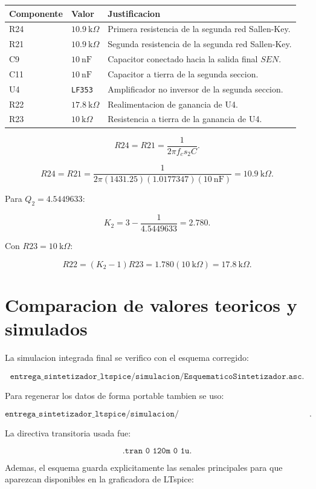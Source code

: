 ﻿\documentclass[11pt,letterpaper]{article}
\newcommand{\kohm}{\text{k}\Omega}
\begin{document}
\begin{longtable}{p{2.0cm}p{4.2cm}p{8.7cm}}
\toprule
Componente & Valor & Justificacion \\
\midrule
\endhead
R24 & \(10.9~\kohm\) & Primera resistencia de la segunda red Sallen-Key. \\
R21 & \(10.9~\kohm\) & Segunda resistencia de la segunda red Sallen-Key. \\
C9 & \(10~\text{nF}\) & Capacitor conectado hacia la salida final \(SEN\). \\
C11 & \(10~\text{nF}\) & Capacitor a tierra de la segunda seccion. \\
U4 & \texttt{LF353} & Amplificador no inversor de la segunda seccion. \\
R22 & \(17.8~\kohm\) & Realimentacion de ganancia de U4. \\
R23 & \(10~\kohm\) & Resistencia a tierra de la ganancia de U4. \\
\bottomrule
\end{longtable}

\[
R24=R21=\frac{1}{2\pi f_cs_2C}.
\]

\[
R24=R21=
\frac{1}{2\pi(1431.25)(1.0177347)(10~\text{nF})}
=10.9~\kohm.
\]

Para \(Q_2=4.5449633\):

\[
K_2=3-\frac{1}{4.5449633}=2.780.
\]

Con \(R23=10~\kohm\):

\[
R22=(K_2-1)R23=1.780(10~\kohm)=17.8~\kohm.
\]

\section{Comparacion de valores teoricos y simulados}

La simulacion integrada final se verifico con el esquema corregido:

\[
\texttt{entrega\_sintetizador\_ltspice/simulacion/EsquematicoSintetizador.asc}.
\]

Para regenerar los datos de forma portable tambien se uso:

\[
\texttt{entrega\_sintetizador\_ltspice/simulacion/EsquematicoSintetizador\_portable.cir}.
\]

La directiva transitoria usada fue:

\[
\texttt{.tran 0 120m 0 1u}.
\]

Ademas, el esquema guarda explicitamente las senales principales para que
aparezcan disponibles en la graficadora de LTspice:
\end{document}
